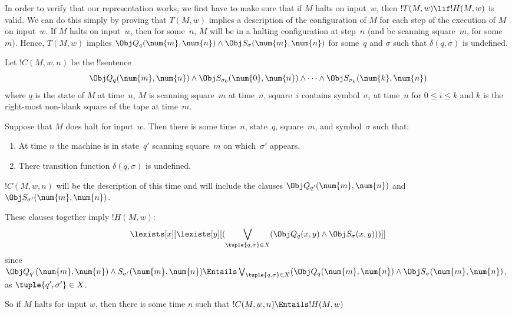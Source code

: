 \documentclass[../../../include/open-logic-section]{subfiles}
\begin{document}

\begin{explain}
In order to verify that our representation works, we first have to
make sure that if $M$ halts on input~$w$, then $!T(M, w) \lif !H(M,
w)$ is valid. We can do this simply by proving that $T(M, w)$ implies
a description of the configuration of $M$ for each step of the
execution of $M$ on input~$w$. If $M$ halts on input~$w$, then for
some~$n$, $M$ will be in a halting configuration at step~$n$ (and be
scanning square~$m$, for some $m$). Hence, $T(M, w)$ implies $\Obj
Q_q(\num{m}, \num{n}) \land \Obj S_\sigma(\num{m}, \num{n})$ for
some~$q$ and $\sigma$ such that $\delta(q, \sigma)$ is undefined.
\end{explain}

\begin{defn} 
Let $!C(M, w, n)$ be the !!{sentence}
\[ 
\Obj Q_q(\num{m}, \num{n}) \land \Obj S_{\sigma_0}(\num{0}, \num{n})
\land \dots \land \Obj S_{\sigma_k}(\num{k}, \num{n})
\] 
where $q$ is the state
of $M$ at time~$n$, $M$ is scanning square~$m$ at time~$n$, square~$i$
contains symbol~$\sigma_i$ at time~$n$ for $0 \le i \le k$ and $k$ is the
right-most non-blank square of the tape at time~$m$. 
\end{defn}

Suppose that $M$ does halt for input~$w$. Then there is some
time~$n$, state~$q$, square~$m$, and symbol~$\sigma$ such that:
\begin{enumerate} 
\item At time $n$ the machine is in state~$q'$ scanning square~$m$ on which~$\sigma'$ appears. 
\item There transition function $\delta(q, \sigma)$ is undefined.
\end{enumerate}

$!C(M, w, n)$ will be the description of this time and will include
the clauses $\Obj Q_{q'}(\num{m}, \num{n})$ and $\Obj
S_{\sigma'}(\num{m}, \num{n})$.

These clauses together imply $!H(M, w)$:
\[
\lexists[x][\lexists[y][(\bigvee_{\tuple{q, \sigma} \in
      X}(\Obj Q_q(x, y) \land \Obj S_\sigma(x, y)))]]
\]
since $\Obj Q_{q'}(\num{m}, \num{n}) \land S_{\sigma'}(\num{m},
\num{n}) \Entails \bigvee_{\tuple{q, \sigma} \in X} (\Obj Q_q(\num{m},
\num{n}) \land \Obj S_{\sigma}(\num{m}, \num{n})$, as
$\tuple{q',\sigma'} \in X$.

So if $M$ halts for input $w$, then there is some time $n$ such that
$!C(M, w, n) \Entails !H(M,w)$
\end{document}
